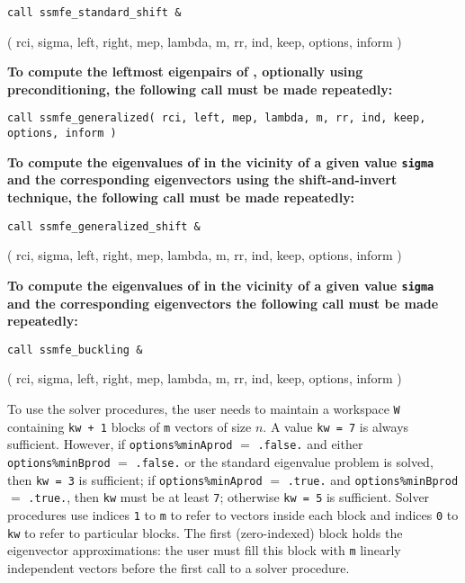 \medskip
{\tt call
ssmfe\_standard\_shift \&

\hspace{8mm} 
( rci, sigma, left, right, mep, lambda, m, rr, ind, keep, options, inform )
}

\medskip
\noindent
{\bf
To compute the leftmost eigenpairs of ,
optionally using preconditioning,
the following call must be made repeatedly:
}

\medskip
{\tt call
ssmfe\_generalized( rci, left, mep, lambda, m, rr, ind, 
keep, options, inform )
}

\medskip
\noindent
{\bf
To compute the eigenvalues of  %
in the vicinity of 
a given value {\tt sigma}
and the corresponding eigenvectors using the shift-and-invert technique,
the following call must be made repeatedly:
}

\medskip
{\tt call
ssmfe\_generalized\_shift \&

\hspace{8mm} 
( rci, sigma, left, right, mep, lambda, m, rr, ind, keep, options, inform )
}

\medskip
\noindent
{\bf
To compute the eigenvalues of 
in the vicinity of a given value {\tt sigma}
and the corresponding eigenvectors 
the following call must be made repeatedly:
}

\medskip
{\tt call
ssmfe\_buckling \&

\hspace{8mm} 
( rci, sigma, left, right, mep, lambda, m, rr, ind, keep, options, inform )
}

\medskip
To use the solver procedures,
the user needs to maintain a workspace {\tt W} containing
{\tt kw + 1} blocks of {\tt m} vectors of size $n$.
A value {\tt kw = 7} is always sufficient. 
However, if {\tt options\%minAprod} $=$ {\tt .false.}
and either {\tt options\%minBprod} $=$ {\tt .false.} or 
the standard eigenvalue problem  is solved,
then {\tt kw = 3} is sufficient; 
if 
{\tt options\%minAprod} $=$ {\tt .true.} and
{\tt options\%minBprod} $=$ {\tt .true.},
then {\tt kw} must be at least {\tt 7};
otherwise {\tt kw = 5} is sufficient.
Solver procedures
use indices {\tt 1} to {\tt m} 
to refer to vectors inside each block
and indices {\tt 0} to {\tt kw} 
to refer to particular blocks.
The first (zero-indexed) block holds the eigenvector approximations:
the user must fill this block with 
{\tt m} linearly independent vectors before the first call
to a solver procedure.

